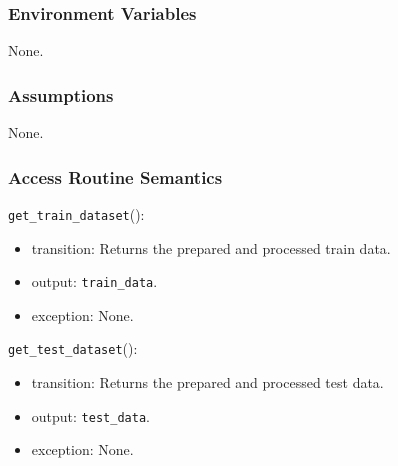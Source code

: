 \documentclass[12pt, titlepage]{article}
\def\code#1{\texttt{#1}}
\begin{document}
\subsubsection{Environment Variables}
None.

\subsubsection{Assumptions}
None.

\subsubsection{Access Routine Semantics}

\noindent \code{get\_train\_dataset}():
\begin{itemize}
  \item transition: Returns the prepared and processed train data.
  \item output: \code{train\_data}.
  \item exception: None.
\end{itemize}

\noindent \code{get\_test\_dataset}():
\begin{itemize}
  \item transition: Returns the prepared and processed test data.
  \item output: \code{test\_data}.
  \item exception: None.
\end{itemize}
\end{document}
